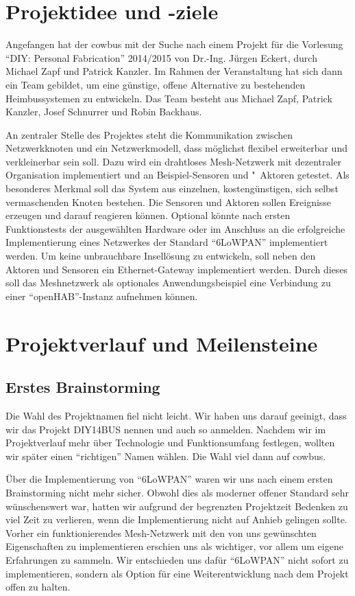 \documentclass{IEEEtran}
\begin{document}
\section{Projektidee und -ziele}
    Angefangen hat der cowbus mit der Suche nach einem Projekt für die Vorlesung 
    \enquote{DIY: Personal Fabrication} 2014/2015 von Dr.-Ing. Jürgen Eckert, durch 
    Michael Zapf und Patrick Kanzler. Im Rahmen der Veranstaltung hat sich dann ein 
    Team gebildet, um eine günstige, offene Alternative zu bestehenden Heimbussystemen 
    zu entwickeln. Das Team besteht aus Michael Zapf, Patrick Kanzler, Josef Schnurrer 
    und Robin Backhaus. 

    An zentraler Stelle des Projektes steht die Kommunikation zwischen Netzwerkknoten 
    und ein Netzwerkmodell, dass möglichst flexibel erweiterbar und verkleinerbar 
    sein soll. 
    Dazu wird ein drahtloses Mesh-Netzwerk mit dezentraler Organisation implementiert 
    und an Beispiel-Sensoren und "~Aktoren getestet. 
    Als besonderes Merkmal soll das System aus einzelnen, kostengünstigen, sich 
    selbst vermaschenden Knoten bestehen.
    Die Sensoren und Aktoren sollen Ereignisse erzeugen und darauf reagieren können. 
    Optional könnte nach ersten Funktionstests der ausgewählten Hardware oder im 
    Anschluss an die erfolgreiche Implementierung eines Netzwerkes der Standard 
    \enquote{\ac{6LoWPAN}} implementiert werden. 
    Um keine unbrauchbare Insellösung zu entwickeln, soll neben den Aktoren und 
    Sensoren ein Ethernet-Gateway implementiert werden. Durch dieses soll das 
    Meshnetzwerk als optionales Anwendungsbeispiel eine Verbindung zu 
    einer \enquote{\ac{openHAB}}-Instanz aufnehmen können.


\section{Projektverlauf und Meilensteine}
    \subsection{Erstes Brainstorming}
    Die Wahl des Projektnamen fiel nicht leicht. Wir haben uns darauf geeinigt, dass 
    wir das Projekt DIY14BUS nennen und auch so anmelden. Nachdem wir im 
    Projektverlauf mehr über Technologie und Funktionsumfang festlegen, wollten wir 
    später einen \enquote{richtigen} Namen wählen. Die Wahl viel dann auf cowbus.

    Über die Implementierung von \enquote{\ac{6LoWPAN}} waren wir uns nach einem ersten 
    Brainstorming nicht mehr sicher. Obwohl dies als moderner offener Standard 
    sehr wünschenswert war, hatten wir aufgrund der begrenzten Projektzeit Bedenken 
    zu viel Zeit zu verlieren, wenn die Implementierung nicht auf Anhieb gelingen 
    sollte. Vorher ein funktionierendes Mesh-Netzwerk mit den von uns gewünschten 
    Eigenschaften zu implementieren erschien uns als wichtiger, vor allem um 
    eigene Erfahrungen zu sammeln. Wir entschieden uns dafür \enquote{\ac{6LoWPAN}} 
    nicht sofort zu implementieren, sondern als Option für eine Weiterentwicklung 
    nach dem Projekt offen zu halten.
\end{document}
